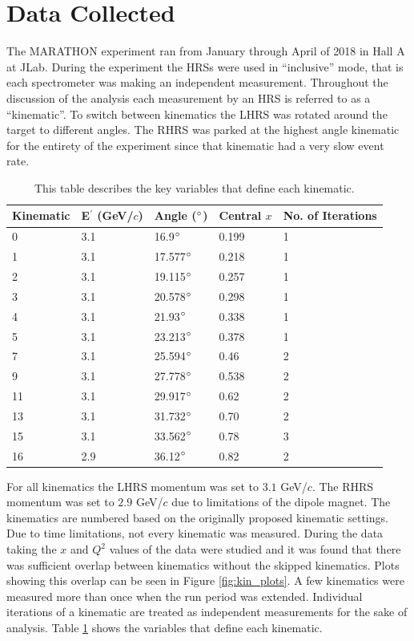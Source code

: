 \section{Data Collected}

The MARATHON experiment ran from January through April of 2018 in Hall A at JLab. During the experiment the HRSs were used in ``inclusive'' mode, that is each spectrometer was making an independent measurement. Throughout the discussion of the analysis each measurement by an HRS is referred to as a ``kinematic''. To switch between kinematics the LHRS was rotated around the target to different angles. The RHRS was parked at the highest angle kinematic for the entirety of the experiment since that kinematic had a very slow event rate.

\begin{table}[h]
\begin{center}
\begin{tabular}{|l|l|l|l|l|}
\hline
\textbf{Kinematic} & \textbf{E$^\prime$} (GeV/$c$) & \textbf{Angle} ($\degree$) & \textbf{Central $x$} &  \textbf{No. of Iterations} \\
\hline
\hline
0 & 3.1 & 16.9$\degree$ & 0.199 & 1 \\ \hline
1 & 3.1 & 17.577$\degree$ & 0.218 & 1 \\ \hline
2 & 3.1 & 19.115$\degree$ & 0.257 & 1 \\ \hline
3 & 3.1 & 20.578$\degree$ & 0.298 & 1 \\ \hline
4 & 3.1 & 21.93$\degree$ & 0.338 & 1 \\ \hline
5 & 3.1 & 23.213$\degree$ & 0.378 & 1 \\ \hline
7 & 3.1 & 25.594$\degree$ & 0.46 & 2 \\ \hline
9 & 3.1 & 27.778$\degree$ & 0.538 & 2 \\ \hline
11 & 3.1 & 29.917$\degree$ & 0.62 & 2 \\ \hline
13 & 3.1 & 31.732$\degree$ & 0.70 & 2 \\ \hline
15 & 3.1 & 33.562$\degree$ & 0.78 & 3 \\ \hline
16 & 2.9 & 36.12$\degree$ & 0.82 & 2 \\ \hline
\end{tabular}
\caption{This table describes the key variables that define each kinematic.}
\label{tbl:kins}
\end{center}
\end{table}

For all kinematics the LHRS momentum was set to $3.1$ GeV/$c$. The RHRS momentum was set to $2.9$ GeV/$c$ due to limitations of the dipole magnet. The kinematics are numbered based on the originally proposed kinematic settings. Due to time limitations, not every kinematic was measured. During the data taking the $x$ and $Q^2$ values of the data were studied and it was found that there was sufficient overlap between kinematics without the skipped kinematics. Plots showing this overlap can be seen in Figure \ref{fig:kin_plots}. A few kinematics were measured more than once when the run period was extended. Individual iterations of a kinematic are treated as independent measurements for the sake of analysis. Table \ref{tbl:kins} shows the variables that define each kinematic.

